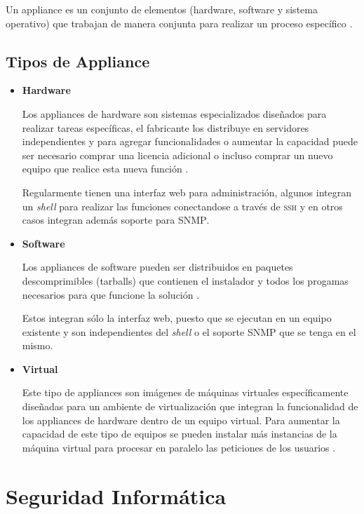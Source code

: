 Un appliance es un conjunto de elementos (hardware, software y sistema operativo) que trabajan de manera conjunta para realizar un proceso espec\'{i}fico \cite{smith_linux_2007}.

    \subsection{Tipos de Appliance}

\begin{itemize}

  \item \textbf{Hardware}

Los appliances de hardware son sistemas especializados dise\~{n}ados para realizar tareas espec\'{i}ficas, el fabricante los distribuye en servidores independientes y para agregar funcionalidades o aumentar la capacidad puede ser necesario comprar una licencia adicional o incluso comprar un nuevo equipo que realice esta nueva funci\'{o}n \cite{}.

Regularmente tienen una interfaz web para administraci\'{o}n, algunos integran un \textit{shell} para realizar las funciones conectandose a trav\'{e}s de \textsc{ssh} y en otros casos integran adem\'{a}s soporte para \textsc{SNMP}.

  \item \textbf{Software}

Los appliances de software pueden ser distribuidos en paquetes descomprimibles (tarballs) que contienen el instalador y todos los progamas necesarios para que funcione la soluci\'{o}n \cite{_bitnami:_????}.

Estos integran s\'{o}lo la interfaz web, puesto que se ejecutan en un equipo existente y son independientes del \textit{shell} o el soporte \textsc{SNMP} que se tenga en el mismo.

  \item \textbf{Virtual}

Este tipo de appliances son im\'{a}genes de m\'{a}quinas virtuales espec\'{i}ficamente dise\~{n}adas para un ambiente de virtualizaci\'{o}n que integran la funcionalidad de los appliances de hardware dentro de un equipo virtual. Para aumentar la capacidad de este tipo de equipos se pueden instalar m\'{a}s instancias de la m\'{a}quina virtual para procesar en paralelo las peticiones de los usuarios \cite{_why_????}.

\end{itemize}

\section {Seguridad Inform\'{a}tica}

